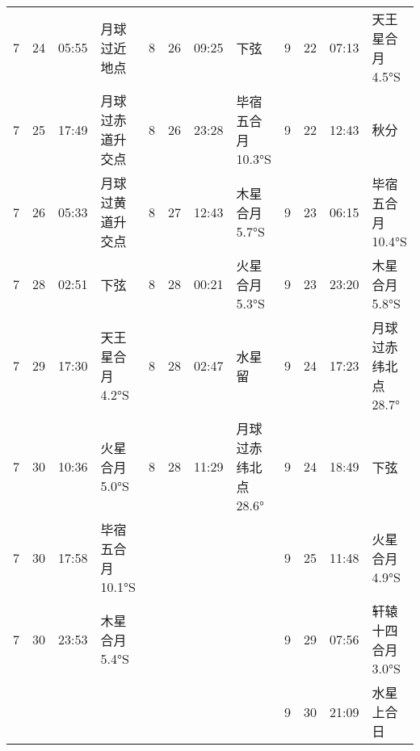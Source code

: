 \begin{tabular}{llll|llll|llll}
7 & 24 & 05:55 & 月球过近地点 & 8 & 26 & 09:25 & 下弦 & 9 & 22 & 07:13 & 天王星合月 4.5°S \tabularnewline
7 & 25 & 17:49 & 月球过赤道升交点 & 8 & 26 & 23:28 & 毕宿五合月 10.3°S & 9 & 22 & 12:43 & 秋分 \tabularnewline
7 & 26 & 05:33 & 月球过黄道升交点 & 8 & 27 & 12:43 & 木星合月 5.7°S & 9 & 23 & 06:15 & 毕宿五合月 10.4°S \tabularnewline
7 & 28 & 02:51 & 下弦 & 8 & 28 & 00:21 & 火星合月 5.3°S & 9 & 23 & 23:20 & 木星合月 5.8°S \tabularnewline
7 & 29 & 17:30 & 天王星合月 4.2°S & 8 & 28 & 02:47 & 水星留 & 9 & 24 & 17:23 & 月球过赤纬北点 28.7° \tabularnewline
7 & 30 & 10:36 & 火星合月 5.0°S & 8 & 28 & 11:29 & 月球过赤纬北点 28.6° & 9 & 24 & 18:49 & 下弦 \tabularnewline
7 & 30 & 17:58 & 毕宿五合月 10.1°S &  &  &  &  & 9 & 25 & 11:48 & 火星合月 4.9°S \tabularnewline
7 & 30 & 23:53 & 木星合月 5.4°S &  &  &  &  & 9 & 29 & 07:56 & 轩辕十四合月 3.0°S \tabularnewline
 &  &  &  &  &  &  &  & 9 & 30 & 21:09 & 水星上合日 \tabularnewline
\hline \end{tabular}

